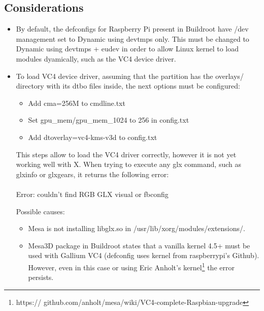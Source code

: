 \documentclass[12pt,a4paper,oneside]{article}
\begin{document}
\subsection*{Considerations}
\begin{itemize}
    \item By default, the defconfigs for Raspberry Pi present in Buildroot have
    /dev management set to {\selectfont Dynamic using devtmps only}.
    This must be changed to {\selectfont Dynamic using devtmps +
    eudev} in order to allow Linux kernel to load modules dyamically, such as the
    VC4 device driver.

    \item To load VC4 device driver, assuming that the {\selectfont
    \boot} partition has the {\selectfont overlays/} directory with
    its dtbo files inside, the next options must be configured:
    \begin{itemize}
      \item Add cma=256M to cmdline.txt
      \item Set gpu\_mem/gpu\_mem\_1024 to 256 in config.txt
      \item Add dtoverlay=vc4-kms-v3d to config.txt
    \end{itemize}

    This steps allow to load the VC4 driver correctly, however it is not yet
    working well with X. When trying to execute any {\selectfont
    glx} command, such as {\selectfont glxinfo} or
    {\selectfont glxgears}, it returns the following error:\\\\
    {\selectfont Error: couldn't find RGB GLX visual or fbconfig}

    Possible causes:
    \begin{itemize}
      \item Mesa is not installing libglx.so in {\selectfont
      /usr/lib/xorg/modules/extensions/}.
      \item Mesa3D package in Buildroot states that a vanilla kernel 4.5+ must
      be used with Gallium VC4 (defconfig uses kernel from raspberrypi's Github).
      However, even in this case or using Eric Anholt's kernel\footnote{ https://
      github.com/anholt/mesa/wiki/VC4-complete-Raspbian-upgrade} the error persists.
    \end{itemize}


\end {itemize}
\end{document}
